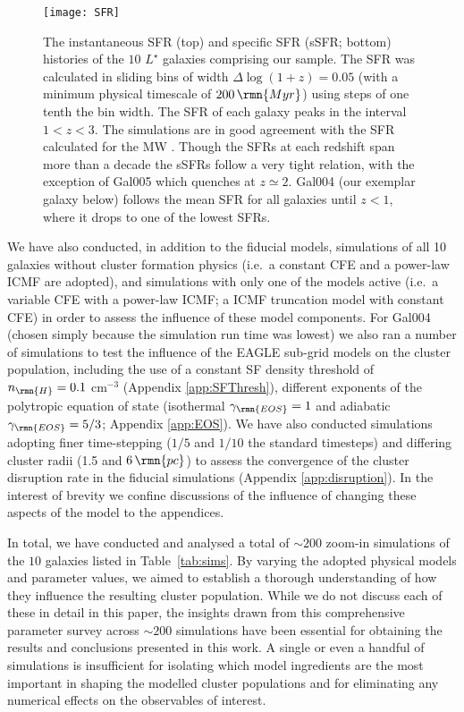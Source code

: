 \documentclass[fleqn,usenatbib]{mnras}
\newcommand\Myr{\,\rmn{Myr}}
\newcommand\pc{\,\rmn{pc}}
\newcommand{\numgal}{10}
\newcommand{\numsim}{\sim 200}
\begin{document}
\begin{figure}
  \texttt{[image: SFR]}
  \caption{The instantaneous SFR (top) and specific SFR (sSFR; bottom) histories of the $\numgal$ $L^\star$ galaxies comprising our sample. The SFR was calculated in sliding bins of width $\Delta \log(1+z) = 0.05$ (with a minimum physical timescale of $200 \Myr$) using steps of one tenth the bin width. The SFR of each galaxy peaks in the interval $1 < z < 3$. The simulations are in good agreement with the SFR calculated for the MW \citet[solid black line with the grey shaded region showing the standard deviation;][]{Snaith_et_al_14,Snaith_et_al_15}. Though the SFRs at each redshift span more than a decade the sSFRs follow a very tight relation, with the exception of Gal005 which quenches at $z\simeq 2$. Gal004 (our exemplar galaxy below) follows the mean SFR for all galaxies until $z<1$, where it drops to one of the lowest SFRs.}
  \label{fig:SFR}
\end{figure}

We have also conducted, in addition to the fiducial models, simulations of all 10 galaxies without cluster formation physics (i.e.~a constant CFE and a power-law ICMF are adopted), and simulations with only one of the models active (i.e.~a variable CFE with a power-law ICMF; a ICMF truncation model with constant CFE) in order to assess the influence of these model components. For Gal004 (chosen simply because the simulation run time was lowest) we also ran a number of simulations to test the influence of the EAGLE sub-grid models on the cluster population, including the use of a constant SF density threshold of $n_\rmn{H} = 0.1$ cm$^{-3}$ (Appendix \ref{app:SFThresh}), different exponents of the polytropic equation of state (isothermal $\gamma_\rmn{EOS}=1$ and adiabatic $\gamma_\rmn{EOS}=5/3$; Appendix \ref{app:EOS}). We have also conducted simulations adopting finer time-stepping  ($1/5$ and $1/10$ the standard timesteps) and differing cluster radii (1.5 and $6 \pc$) to assess the convergence of the cluster disruption rate in the fiducial simulations (Appendix \ref{app:disruption}). In the interest of brevity we confine discussions of the influence of changing these aspects of the model to the appendices.

In total, we have conducted and analysed a total of $\numsim$ zoom-in simulations of the $\numgal$ galaxies listed in Table~\ref{tab:sims}. By varying the adopted physical models and parameter values, we aimed to establish a thorough understanding of how they influence the resulting cluster population. While we do not discuss each of these in detail in this paper, the insights drawn from this comprehensive parameter survey across $\numsim$ simulations have been essential for obtaining the results and conclusions presented in this work. A single or even a handful of simulations is insufficient for isolating which model ingredients are the most important in shaping the modelled cluster populations and for eliminating any numerical effects on the observables of interest. 
\end{document}
